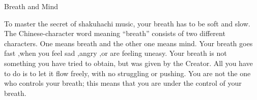 ﻿Breath and Mind 

To master the secret of shakuhachi music, your breath has to be soft and slow.
The Chinese-character word meaning “breath” consists of two different characters.
One means breath and the other one means mind.
Your breath goes fast ,when you feel sad ,angry ,or are feeling uneasy.
Your breath is not something you have tried to obtain, but was given by the Creator.
All you have to do is to let it flow freely, with no struggling or pushing.
You are not the one who controls your breath; this means that you are under the control of your breath.


